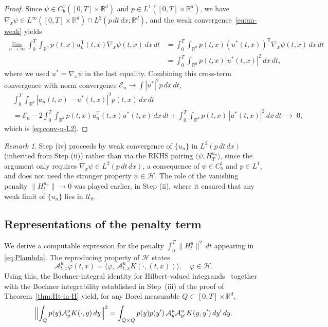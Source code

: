 \documentclass[11pt,leqno]{article}
\theoremstyle{plain}
\theoremstyle{remark}
\newtheorem*{rem}{Remark}
\theoremstyle{definition}
\numberwithin{equation}{section}
\numberwithin{figure}{section}
\numberwithin{table}{section}
\begin{document}
\begin{proof}
Since $\psi\in C_b^1([0,T]\times\mathbb{R}^d)$ and $p\in L^1([0,T]\times\mathbb{R}^d)$, we have
$\nabla_x\psi\in L^\infty([0,T]\times\mathbb{R}^d)\cap L^2(p\,dt\,dx;\mathbb{R}^d)$, and the
weak convergence~\eqref{eq:un-weak} yields
\begin{align*}
 \lim_{n\to\infty}\int_0^T\int_{\mathbb{R}^d} p(t,x)u_n^{\mathsf{T}}(t,x)\nabla_x\psi(t,x)\,dx\,dt
 &=
 \int_0^T\int_{\mathbb{R}^d} p(t,x)(u^\ast(t,x))^{\mathsf{T}}\nabla_x\psi(t,x)\,dx\,dt \\ 
 &=\int_0^T\int_{\mathbb{R}^d} p(t,x)|u^\ast(t,x)|^2\,dx\,dt,
\end{align*}
where we used $u^\ast=\nabla_x\psi$ in the last equality.  Combining
this cross-term convergence with norm convergence
$\mathcal{E}_n\to\int|u^\ast|^2p\,dx\,dt$,
\begin{align*}
 &\int_0^T\int_{\mathbb{R}^d} |u_n(t,x)-u^\ast(t,x)|^2p(t,x)\,dx\,dt \\ 
 &= \mathcal{E}_n
   - 2\int_0^T\int_{\mathbb{R}^d} p(t,x)u_n^{\mathsf{T}}(t,x)u^\ast(t,x)\,dx\,dt
   + \int_0^T\int_{\mathbb{R}^d} p(t,x)\,|u^\ast(t,x)|^2\,dx\,dt
 \;\longrightarrow\; 0,
\end{align*}
which is \eqref{eq:conv-u-L2}.
\end{proof}

\begin{rem}
Step (iv) proceeds by weak convergence of $\{u_n\}$ in
$L^2(p\,dt\,dx)$ (inherited from Step (ii)) rather than via the
RKHS pairing $\langle\psi,H_T^{u_n}\rangle$, since the argument only
requires $\nabla_x\psi\in L^2(p\,dt\,dx)$, a consequence of
$\psi\in C_b^1$ and $p\in L^1$, and does not need the stronger
property $\psi\in\mathcal{H}$.  The role of the vanishing penalty
$\|H_t^{u_n}\|\to 0$ was played earlier, in Step (ii), where it
ensured that any weak limit of $\{u_n\}$ lies in $\mathcal{U}_0$.
\end{rem}


\subsection{Representations of the penalty term}
\label{sec:penalty-expansion}

We derive a computable expression for the penalty $\int_0^T\|H_t^u\|^2\,dt$ appearing in \eqref{eq:Plambda}.
The reproducing property of $\mathcal{H}$ states
\[
 \mathcal{A}^u_{t,x}\varphi(t,x) = \langle \varphi,\, \mathcal{A}^u_{t,x}K(\cdot,(t,x))\rangle, \quad \varphi\in\mathcal{H}.
\]
Using this, the Bochner-integral identity for Hilbert-valued
integrands~\cite[Proposition~1.2.4]{Hytonen2016} together with the
Bochner integrability established in Step~(iii) of the proof of
Theorem~\ref{thm:Ht-in-H} yield, for any Borel measurable $Q\subset [0,T]\times\mathbb{R}^d$,
\begin{equation}\label{eq:RKHS-norm-integral}
 \Bigl\|\int_Q p(y)\mathcal{A}^u_y K(\cdot,y)\,dy\Bigr\|^2
 = \int_{Q\times Q}p(y)p(y')\,\mathcal{A}^u_y\mathcal{A}^u_{y'}K(y,y')\,dy'\,dy.
\end{equation}
\end{document}
